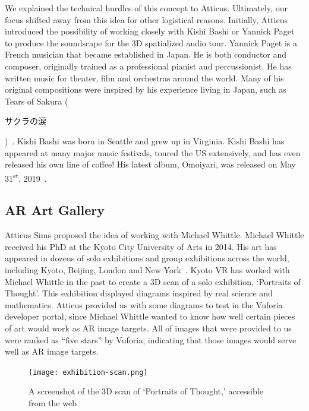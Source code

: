 \documentclass[a4paper, 10pt, american, titlepage]{article}
\begin{document}
We explained the technical hurdles of this concept to Atticus. Ultimately, our
focus shifted away from this idea for other logistical reasons. Initially,
Atticus introduced the possibility of working closely with Kishi Bashi or
Yannick Paget to produce the soundscape for the 3D spatialized audio tour.
Yannick Paget is a French musician that became established in Japan. He is both
conductor and composer, originally trained as a professional pianist and
percussionist. He has written music for theater, film and orchestras around the
world. Many of his original compositions were inspired by his experience living
in Japan, such as Tears of Sakura
(\begin{CJK}{UTF8}{min}サクラの涙\end{CJK})~\autocite{yannickpaget2016}. Kishi
Bashi was born in Seattle and grew up in Virginia. Kishi Bashi has appeared at
many major music festivals, toured the US extensively, and has even released
his own line of coffee! His latest album, Omoiyari, was released on May
31\textsuperscript{st}, 2019~\autocite{kishibashi2019}.

\subsection{AR Art Gallery}
\label{sec:arArtGallery}

Atticus Sims proposed the idea of working with Michael Whittle. Michael Whittle
received his PhD at the Kyoto City University of Arts in 2014. His art has
appeared in dozens of solo exhibitions and group exhibitions across the world,
including Kyoto, Beijing, London and New York~\autocite{michaelwhittle2019}.
Kyoto VR has worked with Michael Whittle in the past to create a 3D scan of a
solo exhibition, `Portraits of Thought'. This exhibition displayed diagrams
inspired by real science and mathematics. Atticus provided us with some
diagrams to test in the Vuforia developer portal, since Michael Whittle wanted
to know how well certain pieces of art would work as AR image targets. All of
images that were provided to us were ranked as ``five stars'' by Vuforia,
indicating that those images would serve well as AR image targets.

\begin{figure}[h]
	\centering
	\texttt{[image: exhibition-scan.png]}
    \caption{A screenshot of the 3D scan of `Portraits of Thought,' accessible
    from the web}
	\label{fig:exhibitionScan}
\end{figure}

\clearpage
\end{document}

